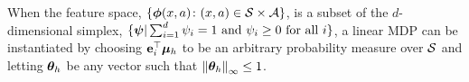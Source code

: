 \begin{example} When the feature space, $\{ \bm{\phi} (x, a) \colon (x,a) \in \mathcal{S} \times \mathcal{A}\}$, is a subset of the $d$-dimensional simplex, $\{\bm{\psi}| \sum_{i=1}^d \psi_i = 1 \text{~and~} \psi_i \ge 0  \text{~for all~}i \}$,  a linear MDP can be instantiated by choosing $\mathbf{e}_i^{\top}\bm{\mu}_h$ to be an arbitrary probability measure over $\mathcal{S}$ and letting $\bm{\theta}_h$ be any vector such that $\left\|{\bm{\theta}_h}\right\|_\infty \le 1$.
\end{example}







